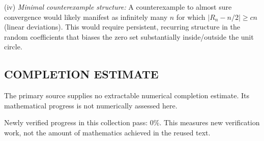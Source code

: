 (iv) \emph{Minimal counterexample structure:}
A counterexample to almost sure convergence would likely manifest as infinitely many $n$ for which $|R_n-n/2|\ge c n$ (linear deviations). This would require persistent, recurring structure in the random coefficients that biases the zero set substantially inside/outside the unit circle.




\subsection*{COMPLETION ESTIMATE}
The primary source supplies no extractable numerical completion estimate. Its mathematical progress is not numerically assessed here.

Newly verified progress in this collection pass: $0\%$. This measures new verification work, not the amount of mathematics achieved in the reused text.
